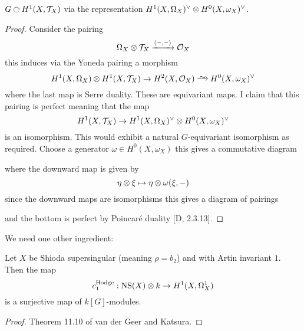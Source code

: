 \documentclass[12pt]{article}
\begin{document}
\begin{lemma}
$G \acts H^1(X, \T_X)$ via the representation $H^1(X, \Omega_X)^{\vee} \otimes H^0(X, \omega_X)^\vee$.
\end{lemma}

\begin{proof}
Consider the pairing
\[ \Omega_X \otimes \mathcal{T}_X \xrightarrow{\left< -, - \right>} \mathcal{O}_{X} \]
this induces via the Yoneda pairing a morphism
\[ H^1(X, \Omega_X) \ot H^1(X, \T_X) \to H^2(X, \struct{X}) \iso H^0(X, \omega_X)^\vee \]
where the last map is Serre duality. These are equivariant maps. I claim that this pairing is perfect meaning that the map
\[ H^1(X, \mathcal{T}_X) \to H^1(X, \Omega_X)^{\vee} \otimes H^0(X, \omega_X)^{\vee} \]
is an isomorphism. This would exhibit a natural $G$-equivariant isomorphism as required. Choose a generator $\omega \in H^0(X, \omega_X)$ this gives a commutative diagram
\begin{center}
\end{center}
where the downward map is given by
\[ \eta \otimes \xi \mapsto \eta \otimes \omega(\xi,-) \]
since the downward maps are isomorphisms this gives a diagram of pairings
\begin{center}
\end{center}
and the bottom is perfect by Poincar\'{e} duality [D, 2.3.13].
\end{proof}

We need one other ingredient:

\begin{lemma}
Let $X$ be Shioda supersingular (meaning $\rho = b_2$) and with Artin invariant $1$. Then the map
\[ c_1^{\text{Hodge}} : \operatorname{\mathrm{NS}}(X) \otimes k \to H^1(X, \Omega_X^1) \]
is a surjective map of $k[G]$-modules.
\end{lemma}

\begin{proof}
Theorem 11.10 of van der Geer and Katsura.
\end{proof}
\end{document}
